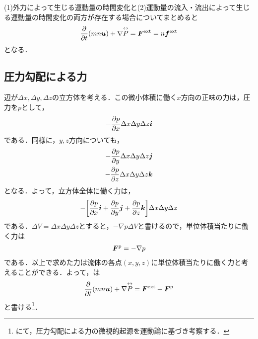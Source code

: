 \documentclass{report}
\begin{document}
      (1)外力によって生じる運動量の時間変化と(2)運動量の流入・流出によって生じる運動量の時間変化の両方が存在する場合についてまとめると
      \begin{align}
        \pdv{t}(mn\bm{u}) + \nabla \overset{\leftrightarrow}{P} = \bm{F}^{\mathrm{ext}} = n\bm{f}^{\mathrm{ext}} \label{eq:momentum2}
      \end{align}
      となる．

    \subsection{圧力勾配による力}
      辺が$\Delta x, \Delta y, \Delta z$の立方体を考える．この微小体積に働く$x$方向の正味の力は，圧力を$p$として，
      \begin{align}
        -\pdv{p}{x}\Delta x \Delta y \Delta z \bm{i}
      \end{align}
      である．同様に，$y,z$方向についても，
      \begin{align}
        -\pdv{p}{y}\Delta x \Delta y \Delta z \bm{j}\\
        -\pdv{p}{z}\Delta x \Delta y \Delta z \bm{k}
      \end{align}
      となる．よって，立方体全体に働く力は，
      \begin{align}
        - \qty[\pdv{p}{x}\bm{i} + \pdv{p}{y}\bm{j} + \pdv{p}{z}\bm{k}]\Delta x \Delta y \Delta z
      \end{align}
      である．$\Delta V = \Delta x \Delta y \Delta z$とすると，$-\nabla p \Delta V$と書けるので，単位体積当たりに働く力は
      \begin{align}
        \bm{F}^{\mathrm{p}} = -\nabla p
      \end{align}
      である．以上で求めた力は流体の各点$(x,y,z)$に単位体積当たりに働く力と考えることができる．よって，は
      \begin{align}
        \pdv{t}(mn\bm{u}) + \nabla \overset{\leftrightarrow}{P} = \bm{F}^{\mathrm{ext}} + \bm{F}^{\mathrm{p}} \label{eq:momentum3}
      \end{align}
    と書ける\footnote{にて，圧力勾配による力の微視的起源を運動論に基づき考察する．}．
\end{document}
